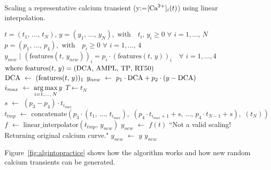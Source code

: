 \begin{algorithm}[ht!]
    \caption{Scaling a representative calcium transient (y:=$[\textrm{Ca}^{2+}]_{i}(t)$) using linear interpolation.}\label{alg:cascaling}
    \begin{algorithmic} 
    \REQUIRE $t=(t_1,\,\dots,\,t_N),\,y=(y_1,\,\dots,\,y_N),\,\,\textrm{with}\quad t_i,\,y_i\ge 0\,\,\forall\,\,i=1,\dots,\,N$ \\ $p=(p_1,\,\dots,\,p_4),\,\,\textrm{with}\quad p_i\ge 0\,\,\forall\,\,i=1,\dots,\,4$
    \ENSURE $y_{new}\,\,|\,\,(\textrm{features}(t,\,y_{new}))_{i} = p_i\cdot(\textrm{features}(t,\,y))_{i}\quad\forall\,\,i=1,\dots,4$ \\ $\textrm{where}\,\,\textrm{features}(t,\,y) = (\textrm{DCA},\,\textrm{AMPL},\,\textrm{TP},\,\textrm{RT50})$ \\ \vspace{0.2cm}
    \STATE $\textrm{DCA}\,\,\leftarrow\,\,(\textrm{features}(t,\,y))_1$
    \STATE $y_{new}\,\,\leftarrow\,\,p_1\cdot\textrm{DCA} + p_2\cdot(y-\textrm{DCA})$
    \STATE $i_{max}\,\,\leftarrow\,\,\operatorname*{arg\,max}\limits_{i=1,\dots,\,N}{y}$
    \STATE $T \leftarrow t_{N}$ \\
    \vspace{0.2cm}
    \STATE $s\,\,\leftarrow\,\,(p_3 - p_4)\cdot t_{i_{max}}$
    \STATE $t_{tmp}\,\,\leftarrow\,\,\textrm{concatenate}(p_3\cdot (t_{1},\,\dots,\,t_{i_{max}}),\,\,(p_4\cdot t_{i_{max}+1}+s,\,\dots,\,p_4\cdot t_{N-1}+s),\,\,(t_{N}))$
    \STATE $f\,\,\leftarrow\,\,\textrm{linear\_interpolator}(t_{tmp},\, y_{new})$
    \STATE $y_{new}\,\,\leftarrow\,\,f(t)$
    \ELSE
    \PRINT ``Not a valid scaling! Returning original calcium curve."
    \STATE $y_{new}\,\,\leftarrow\,\,y$
    \ENDIF
    \RETURN $y_{new}$
    \end{algorithmic}
\end{algorithm}

\vspace{0.2cm}
Figure~\ref{fig:algintopractice} shows how the algorithm works and how new random calcium transients can be generated.

